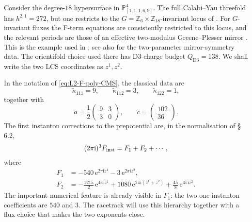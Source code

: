 \begin{example}
                \label{ex:racetrack}
Consider the degree-$18$ hypersurface in
$\mathbb{P}^4_{[1,1,1,6,9]}$.  The full Calabi--Yau threefold has
$h^{2,1}=272$, but one restricts to the
$G=\mathbb Z_6\times\mathbb Z_{18}$-invariant locus of
\cite{Giryavets:2003vd}.  For $G$-invariant fluxes the F-term
equations are consistently restricted to this locus, and the relevant
periods are those of an effective two-modulus Greene--Plesser mirror
\cite{Greene:1990ud}.  This is the example used in
\cite{Demirtas:2019sip}; see also \cite{Candelas:1993dm} for the
two-parameter mirror-symmetry data.  The orientifold choice used there
has D3-charge budget $Q_{\mathrm{D3}}=138$.  We shall write the two
LCS coordinates as $z^1,z^2$.


In the notation of \eqref{eq:L2-F-poly-CMS}, the classical data are
\begin{equation}
    \widetilde\kappa_{111}=9,\qquad
    \widetilde\kappa_{112}=3,\qquad
    \widetilde\kappa_{122}=1,
\end{equation}
together with
\begin{equation}
    \widetilde a
    =
    \frac12
    \begin{pmatrix}
        9 & 3\\
        3 & 0
    \end{pmatrix},
    \qquad
    \widetilde c
    =
    \begin{pmatrix}
        102\\
        36
    \end{pmatrix}.
\end{equation}
The first instanton corrections to the prepotential are, in the
normalisation of \cite{McAllister:2025qwq} \S\,6.2,
\begin{equation}
    (2\pi\mathrm{i})^3F_{\rm inst}
    =
    F_1+F_2+\cdots ,
\end{equation}
where
\begin{align}
    F_1
    &=
    -540\,\mathrm{e}^{2\pi\mathrm{i}z^1}
    -3\,\mathrm{e}^{2\pi\mathrm{i}z^2},\\
    F_2
    &=
    -\frac{1215}{2}\,\mathrm{e}^{4\pi\mathrm{i}z^1}
    +1080\,\mathrm{e}^{2\pi\mathrm{i}(z^1+z^2)}
    +\frac{45}{8}\,\mathrm{e}^{4\pi\mathrm{i}z^2}.
\end{align}
The important numerical feature is already visible in $F_1$: the two
one-instanton coefficients are $540$ and $3$.  The racetrack will use
this hierarchy together with a flux choice that makes the two
exponents close.


\end{example}
